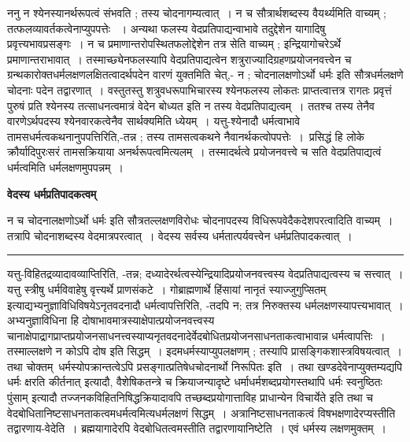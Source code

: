 \documentclass[11pt, openany]{book}
\makeatletter
\def\blfootnote{\gdef\@thefnmark{}\@footnotetext}
\makeatother
\begin{document}
 {\br ननु} न श्येनस्यानर्थरूपत्वं संभवति ; तस्य चोदनागम्यत्वात्~। न च सौत्रार्थशब्दस्य वैयर्थ्यमिति वाच्यम् ; तत्फलव्यावर्तकत्वेनाप्युपपत्तेः ~। अन्यथा फलस्य वेदप्रतिपाद्यन्वाभावे तदुद्देशेन यागादिषु प्रवृत्त्यभावप्रसङ्गः~। न च प्रमाणान्तरोपस्थितफलोद्देशेन तत्र सेति वाच्यम् ; इन्द्रियागोचरेऽर्थे  प्रमाणान्तराभावात्~। तस्माच्छ्येनफलस्यापि वेदप्रतिपाद्यत्वेन शत्रुराज्यादिग्रहणप्रयोजनवत्त्वेन च ग्रन्थकारोक्तधर्मलक्षणलक्षितत्वादर्थपदेन वारणं युक्तमिति चेत्,- न ; {\ab  चोदनालक्षणोऽर्थो धर्मः} इति सौत्रधर्मलक्षणे {\qt चोदनाः} पदेन तद्वारणात्~। वस्तुतस्तु शत्रुवधरूपाभिचारस्य श्येनफलस्य लोकतः प्राप्तत्वात्तत्र रागतः प्रवृत्तं पुरुषं प्रति श्येनस्य तत्साधनत्वमात्रं
वेदेन बोध्यत इति न तस्य वेदप्रतिपाद्यत्वम्~। ततश्च तस्य तेनैव वारणेऽर्थपदस्य श्येनवारकत्वेनैव सार्थक्यमिति ध्येयम्~। यत्तु-श्येनादौ धर्मत्वाभावे तामसधर्मत्वकथनानुपपत्तिरिति,-तन्न ; तस्य तामसत्वकथने नैवानर्थकत्वोपपत्तेः~।~प्रसिद्धं हि लोके क्रौर्यादिपुरःसरं तामसक्रियाया अनर्थरूपत्वमित्यलम्~।
तस्माद\blfootnote{पाठा०\textemdash\ $^{१}${\qt अर्थवत्त्वे}.}\footnotemark र्थत्वे प्रयोजनवत्त्वे च सति
वेदप्रतिपाद्यत्वं धर्मत्वमिति धर्मलक्षणमुपपन्नम्~।
\newpage
\fancyhead[RE]{[ वेदस्य धर्म\textemdash\ }
\begin{center}
\textbf{वेदस्य धर्मप्रतिपादकत्वम्}
\end{center}

{\bl न च {\al चोदनालक्षणोऽर्थो धर्मः} इति सौत्रतल्लक्षणविरोधः चोदनापदस्य विधिरूपवेदैकदेशपरत्वादिति वाच्यम्~। तत्रापि चोदनाशब्दस्य वेदमात्रपरत्वात्~। वेदस्य सर्वस्य धर्मतात्पर्यवत्त्वेन धर्मप्रतिपादकत्वात्~।}\\
\hrule
\vspace{3mm}

यत्तु-विहितद्रव्यादावव्याप्तिरिति, -तन्न; दध्यादेरर्थत्वस्येन्द्रियादिप्रयोजनवत्त्वस्य वेदप्रतिपाद्यत्वस्य च सत्त्वात्~। यत्तु {\qt स्त्रीषु धर्मविवाहेषु वृत्त्यर्थे प्राणसंकटे~।
गोब्राह्मणार्थे हिंसायां नानृतं स्याज्जुगुप्सितम्} इत्याद्यभ्यनुज्ञाविधिविषयेऽनृतवदनादौ धर्मत्वापत्तिरिति,  -तदपि न; तत्र निरुक्तस्य धर्मलक्षणस्यापत्त्यभावात्~।
अभ्यनुज्ञाविधिना हि दोषाभावमात्रस्याक्षेपात्प्रयोजनवत्त्वस्य चानाक्षेपाद्रागप्राप्तप्रयोजनसाधनत्त्वस्याप्यनृतवदनादेर्वेदबोधितप्रयोजनसाधनताकत्वाभावान्न धर्मत्वापत्तिः~। तस्माल्लक्षणे न कोऽपि दोष इति सिद्धम्~। इदमधर्मस्याप्युपलक्षणम् ; तस्यापि प्रासङ्गिकशास्त्रविषयत्वात्~। तथा चोक्तम्\textendash\ {\qt धर्मस्योपक्रान्तत्वेऽपि प्रसङ्गात्प्रतिषेधचोदनार्थो निरूपितः} इति~। तथा खण्डदेवेनाप्युक्तम्\textendash यद्यपि {\qt धर्मः क्षरति कीर्तनात्}  इत्यादौ, वैशेषिकतन्त्रे च {\qt क्रियाजन्यादृष्टे
धर्माधर्मशब्दप्रयोगस्तथापि {\qt धर्मः स्वनुष्ठितः पुंसाम्} इत्यादौ तज्जनकविहितनिषिद्धक्रियादावपि तच्छब्दप्रयोगात्ताविह प्राधान्येन विचार्येते} इति तथा च वेदबोधितानिष्टसाधनताकत्वमधर्मत्वमित्यधर्मलक्षणं सिद्धम्~। अत्रानिष्टसाधनताकत्वं विषभक्षणादेरप्यस्तीति तद्वारणाय-{\br वेदेति~।} ब्रह्मयागादेरपि वेदबोधितत्वमस्तीति तद्वारणाया{\br निष्टेति~।} एवं धर्मस्य लक्षणमुक्तम्~।~\\
\end{document}
